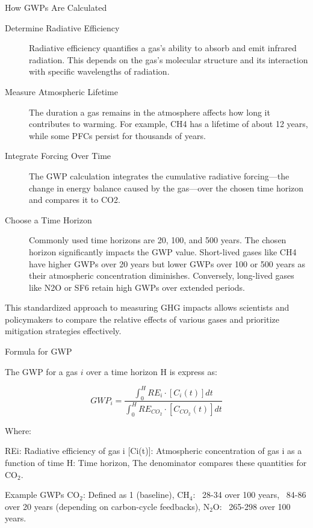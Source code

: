 \documentclass{tufte-handout}\usepackage[]{graphicx}\usepackage[]{xcolor}
\begin{document}
How GWPs Are Calculated

\begin{description}
	\item[Determine Radiative Efficiency] Radiative efficiency quantifies a gas’s ability to absorb and emit infrared radiation. This depends on the gas’s molecular structure and its interaction with specific wavelengths of radiation.

	\item[Measure Atmospheric Lifetime] The duration a gas remains in the atmosphere affects how long it contributes to warming. For example, CH4 has a lifetime of about 12 years, while some PFCs persist for thousands of years.

	\item[Integrate Forcing Over Time] The GWP calculation integrates the cumulative radiative forcing—the change in energy balance caused by the gas—over the chosen time horizon and compares it to CO2.

	\item[Choose a Time Horizon] Commonly used time horizons are 20, 100, and 500 years. The chosen horizon significantly impacts the GWP value. Short-lived gases like CH4 have higher GWPs over 20 years but lower GWPs over 100 or 500 years as their atmospheric concentration diminishes. Conversely, long-lived gases like N2O or SF6 retain high GWPs over extended periods.

\end{description}

This standardized approach to measuring GHG impacts allows scientists and policymakers to compare the relative effects of various gases and prioritize mitigation strategies effectively.


Formula for GWP


The GWP for a gas $i$ over a time horizon H is express as: 

\begin{equation}
GWP_i = \frac{\int^{H}_{0}RE_i \cdot [C_i(t)]dt}{\int^{H}_{0}RE_{CO_2} \cdot [C_{CO_2}(t)]dt}
\end{equation}

Where: 

REi: Radiative efficiency of gas i
[Ci(t)]: Atmospheric concentration of gas i as a function of time
H: Time horizon,
The denominator compares these quantities for CO$_2$.


Example GWPs
CO$_2$: Defined as 1 (baseline),
CH$_4$: ~28-34 over 100 years, ~84-86 over 20 years (depending on carbon-cycle feedbacks),
N$_2$O: ~265-298 over 100 years.
\end{document}
